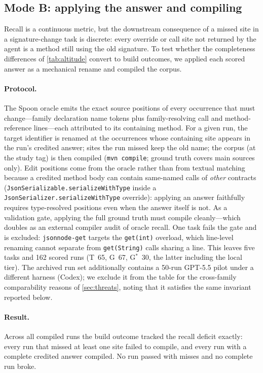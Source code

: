 \documentclass[11pt]{article}
\newcommand{\code}[1]{\texttt{#1}}
\newcommand{\gstar}{G$^{*}$}
\begin{document}
\subsection{Mode B: applying the answer and compiling}
\label{sec:modeb}
Recall is a continuous metric, but the downstream consequence of a missed site
in a signature-change task is discrete: every override or call site not
returned by the agent is a method still using the old signature. To test
whether the completeness differences of \cref{tab:altitude} convert to build
outcomes, we applied each scored answer as a mechanical rename and compiled
the corpus.

\paragraph{Protocol.}
The Spoon oracle emits the exact source positions of every occurrence that
must change---family declaration name tokens plus family-resolving call and
method-reference lines---each attributed to its containing method. For a
given run, the target identifier is renamed at the occurrences whose
containing site appears in the run's credited answer; sites the run missed
keep the old name; the corpus (at the study tag) is then compiled
(\code{mvn compile}; ground truth covers main sources only). Edit positions
come from the oracle rather than from textual matching because a credited
method body can contain same-named calls of \emph{other} contracts
(\code{JsonSerializable.serializeWithType} inside a
\code{JsonSerializer.serializeWithType} override): applying an answer
faithfully requires type-resolved positions even when the answer itself is
not. As a validation gate, applying the full ground truth must compile
cleanly---which doubles as an external compiler audit of oracle recall. One
task fails the gate and is excluded: \code{jsonnode-get} targets the
\code{get(int)} overload, which line-level renaming cannot separate from
\code{get(String)} calls sharing a line. This leaves five tasks and 162
scored runs (T~65, G~67, \gstar{}~30, the latter including the local tier).
The archived run set additionally contains a 50-run GPT-5.5 pilot under a
different harness (Codex); we exclude it from the table for the cross-family
comparability reasons of \cref{sec:threats}, noting that it satisfies the
same invariant reported below.

\paragraph{Result.}
Across all compiled runs the build outcome tracked the recall deficit
exactly: every run that missed at least one site failed to compile, and
every run with a complete credited answer compiled. No run passed with
misses and no complete run broke.
\end{document}
